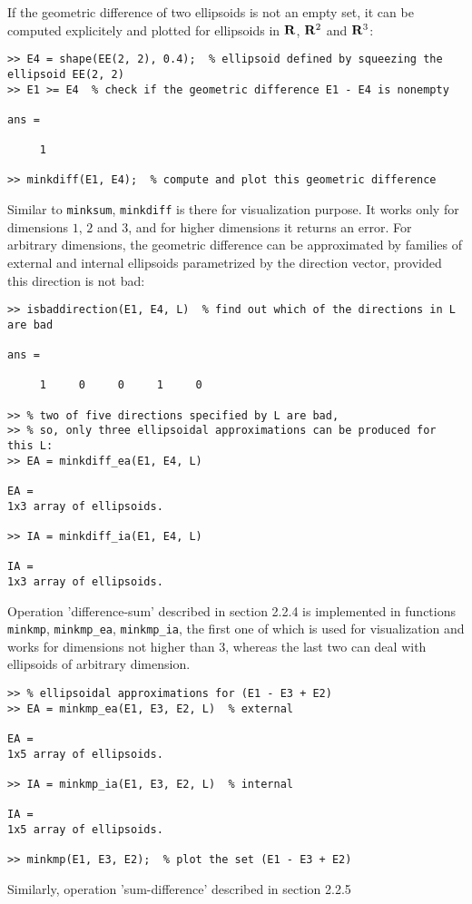 If the geometric difference of two ellipsoids is not an empty set, it can
be computed explicitely and plotted for ellipsoids in ${\bf R}$,
${\bf R}^2$ and ${\bf R}^3$:
{\tt \begin{verbatim}
>> E4 = shape(EE(2, 2), 0.4);  % ellipsoid defined by squeezing the ellipsoid EE(2, 2)
>> E1 >= E4  % check if the geometric difference E1 - E4 is nonempty

ans =

     1

>> minkdiff(E1, E4);  % compute and plot this geometric difference
\end{verbatim} }
Similar to {\tt minksum}, {\tt minkdiff} is there for visualization
purpose. It works only for dimensions $1$, $2$ and $3$, and for higher
dimensions it returns an error. For arbitrary dimensions, the geometric
difference can be approximated by  families of external and internal
ellipsoids parametrized by the direction vector, provided this direction
is not bad:
{\tt \begin{verbatim}
>> isbaddirection(E1, E4, L)  % find out which of the directions in L are bad

ans =

     1     0     0     1     0

>> % two of five directions specified by L are bad,
>> % so, only three ellipsoidal approximations can be produced for this L:
>> EA = minkdiff_ea(E1, E4, L)

EA =
1x3 array of ellipsoids.

>> IA = minkdiff_ia(E1, E4, L)

IA =
1x3 array of ellipsoids.
\end{verbatim} }
Operation 'difference-sum' described in section 2.2.4 is implemented in
functions {\tt minkmp}, {\tt minkmp\_ea}, {\tt minkmp\_ia}, the first one of
which is used for visualization and works for dimensions not higher than $3$,
whereas the last two can deal with ellipsoids of arbitrary dimension.
{\tt \begin{verbatim}
>> % ellipsoidal approximations for (E1 - E3 + E2)
>> EA = minkmp_ea(E1, E3, E2, L)  % external

EA =
1x5 array of ellipsoids.

>> IA = minkmp_ia(E1, E3, E2, L)  % internal

IA =
1x5 array of ellipsoids.

>> minkmp(E1, E3, E2);  % plot the set (E1 - E3 + E2)
\end{verbatim} }
Similarly, operation 'sum-difference' described in section 2.2.5
